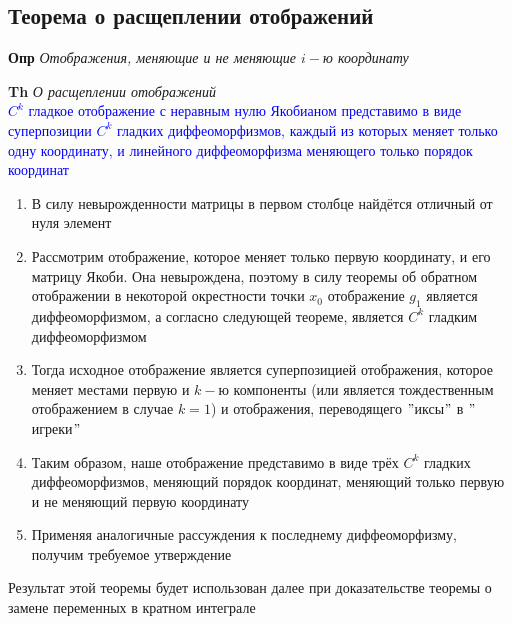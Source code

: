 \subsection{Теорема о расщеплении отображений}

\textbf{Опр} \textit{Отображения, меняющие и не меняющие $i-$ю координату}

\textbf{Th} \textit{О расщеплении отображений} \\
\textcolor{blue}{$C^k$ гладкое отображение с неравным нулю Якобианом представимо в виде суперпозиции $C^k$ гладких
диффеоморфизмов, каждый из которых меняет только одну координату, и линейного диффеоморфизма меняющего только порядок
координат}

\begin{enumerate}
    \item В силу невырожденности матрицы в первом столбце найдётся отличный от нуля элемент
    \item Рассмотрим отображение, которое меняет  только  первую  координату, и его матрицу Якоби.
    Она невырождена, поэтому в силу теоремы об обратном отображении в некоторой окрестности точки $x_0$ отображение $
    g_1$ является диффеоморфизмом, а согласно следующей теореме, является $C^k$ гладким диффеоморфизмом
    \item Тогда исходное отображение является суперпозицией отображения, которое меняет местами первую и $k-$ю
    компоненты (или является тождественным отображением в случае $k = 1$) и отображения, переводящего \("\)иксы\("\) в \("\)игреки\("\)
    \item Таким образом, наше отображение представимо в виде трёх $C^k$ гладких диффеоморфизмов, меняющий порядок
    координат, меняющий только первую и не меняющий первую координату
    \item Применяя аналогичные рассуждения к последнему диффеоморфизму, получим требуемое утверждение
\end{enumerate}

Результат этой теоремы будет использован далее при доказательстве теоремы о замене переменных в кратном интеграле

